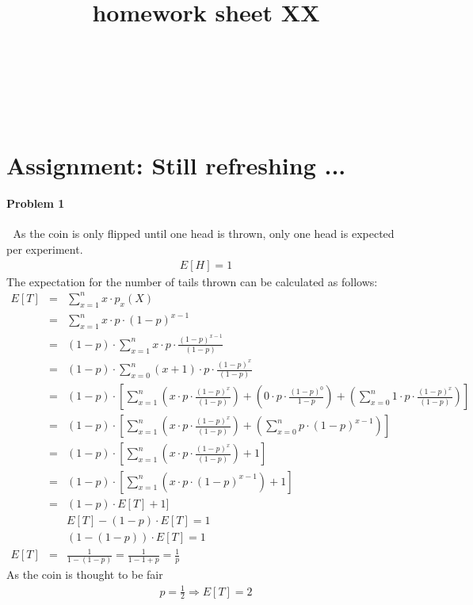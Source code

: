\documentclass{article}
\title{homework sheet XX}
\author{
\name{Andre Seitz}\\
\imat{03622870}\\
\email{andre.seitz@mytum.de}
\And
\name{Linda Leidig} \\
\imat{03608416}\\
\email{linda.leidig@tum.de}
}
\begin{document}
\maketitle

\section{Assignment: Still refreshing ...}
\paragraph*{Problem 1}
$\;$ 
As the coin is only flipped until one head is thrown, only one head is expected per experiment.
\begin{eqnarray}
E[H] = 1
\end{eqnarray}
The expectation for the number of tails thrown can be calculated as follows:
\begin{eqnarray}
E[T] &=& \sum_{x=1}^{n}x\cdot p_x(X)\\
 &=& \sum_{x=1}^{n}x \cdot p \cdot (1-p)^{x-1}\\
 &=& (1-p) \cdot \sum_{x=1}^{n} x \cdot p \cdot \frac{(1-p)^{x-1}}{(1-p)}\\
 &=& (1-p) \cdot \sum_{x=0}^{n} (x+1) \cdot p \cdot \frac{(1-p)^x}{(1-p)}\\
 &=& (1-p) \cdot [\sum_{x=1}^{n}(x \cdot p \cdot \frac{(1-p)^x}{(1-p)}) + (0 \cdot p \cdot \frac{(1-p)^0}{1-p}) + (\sum_{x=0}^n 1 \cdot p \cdot \frac{(1-p)^x}{(1-p)})]\\ 
 &=& (1-p) \cdot [\sum_{x=1}^{n}(x \cdot p \cdot \frac{(1-p)^x}{(1-p)}) + (\sum_{x=0}^n p \cdot (1-p)^{x-1})]\\ 
 &=& (1-p) \cdot [\sum_{x=1}^{n}(x \cdot p \cdot \frac{(1-p)^x}{(1-p)}) + 1]\\ 
 &=& (1-p) \cdot [\sum_{x=1}^{n}(x \cdot p \cdot (1-p)^{x-1}) + 1]\\
 &=& (1-p) \cdot E[T] + 1]\\
&& E[T] - (1-p) \cdot E[T] = 1\\
&& (1-(1-p)) \cdot E[T] = 1 \\
E[T] &=&\frac{1}{1-(1-p)} = \frac{1}{1-1+p} = \frac{1}{p}
\end{eqnarray}
As the coin is thought to be fair
\begin{eqnarray}
p = \frac{1}{2} \Rightarrow E[T] = 2
\end{eqnarray}
\end{document}
